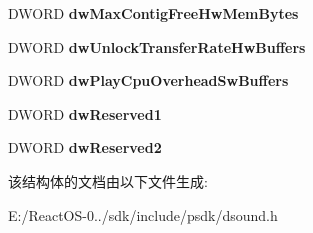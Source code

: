 \begin{DoxyCompactItemize}
D\+W\+O\+RD {\bfseries dw\+Max\+Contig\+Free\+Hw\+Mem\+Bytes}
\item 
\mbox{\label{struct___d_s_c_a_p_s_a1105d8ad609201f60fe180e7e8dcf79d}} 
D\+W\+O\+RD {\bfseries dw\+Unlock\+Transfer\+Rate\+Hw\+Buffers}
\item 
\mbox{\label{struct___d_s_c_a_p_s_ab8f763d65125d4cd199c1c5717b3bac1}} 
D\+W\+O\+RD {\bfseries dw\+Play\+Cpu\+Overhead\+Sw\+Buffers}
\item 
\mbox{\label{struct___d_s_c_a_p_s_ac320197e7a13ccd5d96718353946bbd1}} 
D\+W\+O\+RD {\bfseries dw\+Reserved1}
\item 
\mbox{\label{struct___d_s_c_a_p_s_a24b7cb27382ad4de4f991689c27d09cf}} 
D\+W\+O\+RD {\bfseries dw\+Reserved2}
\end{DoxyCompactItemize}


该结构体的文档由以下文件生成\+:\begin{DoxyCompactItemize}
\item 
E\+:/\+React\+O\+S-\/0../sdk/include/psdk/dsound.\+h\end{DoxyCompactItemize}
